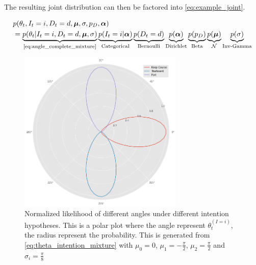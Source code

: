 The resulting joint distribution can then be factored into \cref{eq:example_joint}.

\begin{align}\label{eq:example_joint}
\begin{split}
    &p(\theta_t, I_t=i, D_t=d, \boldsymbol{\mu}, \sigma, p_D, \boldsymbol{\alpha})\\
    &= \underbrace{p(\theta_t | I_t=i, D_t=d, \boldsymbol{\mu}, \sigma)}_{\text{\cref{eq:angle_complete_mixture}}}\underbrace{p(I_t=i | \boldsymbol{\alpha})}_{\text{Categorical}}\underbrace{p(D_t=d)}_{\text{Bernoulli}}\underbrace{p(\boldsymbol{\alpha})}_{\text{Dirichlet}}\underbrace{p(p_D)}_{\text{Beta}}\underbrace{p(\boldsymbol{\mu})}_{\mathcal{N}} \underbrace{p(\sigma)}_{\text{Inv-Gamma}}
\end{split}
\end{align}


\begin{figure}
    \centering
    \includegraphics[width=0.7\textwidth]{figures/intention_angle.png}
    \caption{Normalized likelihood of different angles under different intention hypotheses. This is a polar plot where the angle represent $\theta_t^{(I=i)}$, the radius represent the probability. This is generated from \cref{eq:theta_intention_mixture} with $\mu_0=0$, $\mu_1 = -\frac{\pi}{2}$, $\mu_2=\frac{\pi}{2}$ and $\sigma_i=\frac{\pi}{8}$}
    \label{fig:intention_angle}
\end{figure}

